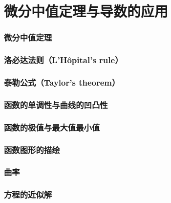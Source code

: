 \documentclass{article}
\begin{document}
  \tableofcontents
  \newpage

  \part{微分中值定理与导数的应用}
  \section{微分中值定理}
    
  \section{洛必达法则（L'Hôpital's rule）}
    
  \section{泰勒公式（Taylor's theorem）}
    
  \section{函数的单调性与曲线的凹凸性}
    
  \section{函数的极值与最大值最小值}
    
  \section{函数图形的描绘}
    
  \section{曲率}
    
  \section{方程的近似解}
    
\end{document}
